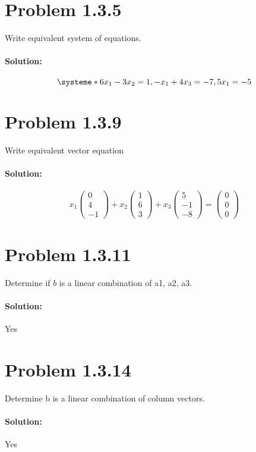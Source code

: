 \documentclass[11pt, notitlepage]{report}
\newenvironment{solution}{\paragraph{Solution:}}{\hfill}
\begin{document}
\newpage
\section{Problem 1.3.5}

Write equivalent system of equations.

\begin{solution}

\[
\systeme*{6x_1-3x_2=1, 
		  -x_1+4x_3=-7,
		  5x_1 =-5}
\]

\end{solution}

\section{Problem 1.3.9}

Write equivalent vector equation

\begin{solution}

\[x_1\left(\begin{matrix}{}
  0\\
  4\\
  -1
\end{matrix}\right)
+%
x_2\left(\begin{matrix}{}
  1\\
  6\\
  3
\end{matrix}\right)
+%
x_3\left(\begin{matrix}{}
  5\\
  -1\\
  -8
\end{matrix}\right)
=
\left(\begin{matrix}{}
  0\\
  0\\
  0
\end{matrix}\right)
\]

\end{solution}

\section{Problem 1.3.11}

Determine if $b$ is a linear combination of a1, a2, a3.

\begin{solution}
Yes
\end{solution}

\section{Problem 1.3.14}
Determine b is a linear combination of column vectors.
\begin{solution}
Yes
\end{solution}
\end{document}
